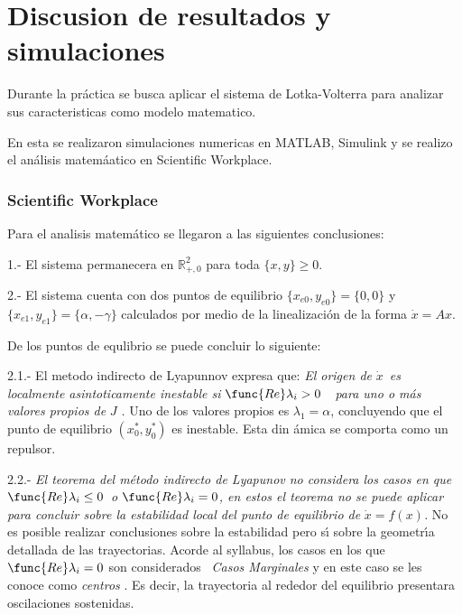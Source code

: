 \documentclass[letterpaper,11pt]{article}
\begin{document}
\section{Discusion de resultados y simulaciones}

Durante la pr\'{a}ctica se busca aplicar el sistema de Lotka-Volterra para
analizar sus caracteristicas como modelo matematico.

En esta se realizaron simulaciones numericas en MATLAB, Simulink y se
realizo el an\'{a}lisis matem\'{a}atico en Scientific Workplace.

\bigskip

\subsubsection{Scientific Workplace}

Para el analisis matem\'{a}tico se llegaron a las siguientes conclusiones:

1.- El sistema permanecera en $%
\mathbb{R}
_{+,0}^{2}$ para toda $\{x,y\}\geq 0$.

2.- El sistema cuenta con dos puntos de equilibrio $\{x_{e0},y_{e0}\}=\{0,0\}
$ y $\{x_{e1},y_{e1}\}=\{\alpha ,-\gamma \}$ calculados por medio de la
linealizaci\'{o}n de la forma $\dot{x}=Ax$.

\bigskip

De los puntos de equlibrio se puede concluir lo siguiente:

2.1.- El metodo indirecto de Lyapunnov expresa que: \textit{El origen de }$%
\dot{x}$\textit{\ es localmente asintoticamente inestable si }$\func{Re}%
\lambda _{i}>0$\textit{\ \ para uno o m\'{a}s valores propios de }$J$\textit{%
.} Uno de los valores propios es $\lambda _{1}=\alpha $, concluyendo que el
punto de equilibrio $(x_{0}^{\ast },y_{0}^{\ast })$ es inestable. Esta din%
\'{a}mica se comporta como un repulsor.

2.2.- \textit{El teorema del m\'{e}todo indirecto de Lyapunov no considera
los casos en que }$\func{Re}\lambda _{i}\leq 0$\textit{\ o }$\func{Re}%
\lambda _{i}=0$\textit{, en estos el teorema no se puede aplicar para
concluir sobre la estabilidad local del punto de equilibrio de }$\dot{x}%
=f(x) $\textit{.} No es posible realizar conclusiones sobre la estabilidad
pero s\'{\i} sobre la geometr\'{\i}a detallada de las trayectorias. Acorde
al syllabus, los casos en los que $\func{Re}\lambda _{i}=0$ son considerados%
\textit{\ Casos Marginales }y en este caso se les conoce como \textit{centros%
}. Es decir, la trayectoria al rededor del equilibrio presentara
oscilaciones sostenidas.
\end{document}
